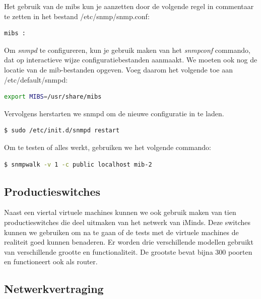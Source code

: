 Het gebruik van de \glspl{mib} kun je aanzetten door de volgende regel in commentaar te zetten in het bestand /etc/snmp/snmp.conf:

\begin{lstlisting}[language=bash]
mibs :
\end{lstlisting}

Om \textit{snmpd} te configureren, kun je gebruik maken van het \textit{snmpconf} commando, dat op interactieve wijze configuratiebestanden aanmaakt.
We moeten ook nog de locatie van de \gls{mib}-bestanden opgeven. Voeg daarom het volgende toe aan /etc/default/snmpd:

\begin{lstlisting}[language=bash]
export MIBS=/usr/share/mibs
\end{lstlisting}

Vervolgens herstarten we snmpd om de nieuwe configuratie in te laden.

\begin{lstlisting}[language=bash]
$ sudo /etc/init.d/snmpd restart
\end{lstlisting}

Om te testen of alles werkt, gebruiken we het volgende commando:

\begin{lstlisting}[language=bash]
$ snmpwalk -v 1 -c public localhost mib-2
\end{lstlisting}




\subsection{Productieswitches}


Naast een viertal virtuele machines kunnen we ook gebruik maken van tien productieswitches die deel uitmaken van het netwerk van iMinds.
Deze switches kunnen we gebruiken om na te gaan of de tests met de virtuele machines de realiteit goed kunnen benaderen.
Er worden drie verschillende modellen gebruikt van verschillende grootte en functionaliteit.
De grootste bevat bijna 300 poorten en functioneert ook als router.

\subsection{Netwerkvertraging}
\label{latency}

